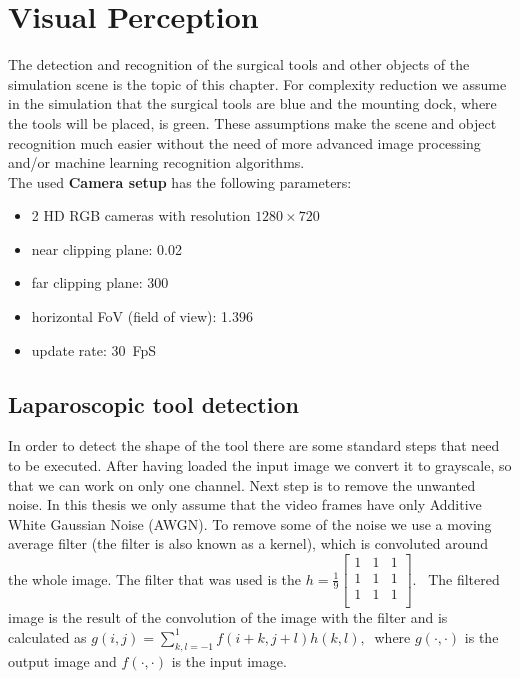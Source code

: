 \chapter{Visual Perception}
The detection and recognition of the surgical tools and other objects of the simulation scene is the topic of this chapter. For complexity reduction we assume in the simulation that the surgical tools are blue and the mounting dock, where the tools will be placed, is green. These assumptions make the scene and object recognition much easier without the need of more advanced image  processing and/or machine learning recognition algorithms.\\

The used \textbf{Camera setup} has the following parameters:
\begin{itemize}
\item 2 HD RGB cameras with resolution $1280 \times 720$
\item near clipping plane: 0.02
\item far clipping plane: 300 
\item horizontal FoV (field of view): 1.396
\item update rate: 30~FpS
\end{itemize}

\section{Laparoscopic tool detection}
\label{laparoscopic-tool-detection}

In order to detect the shape of the tool there are some standard steps that need to be executed. After having loaded the input image we convert it to grayscale, so that we can work on only one channel. Next step is 
to remove the unwanted noise. In this thesis we only assume that the video frames have only Additive White Gaussian Noise (AWGN). To remove some of the noise we use a moving average filter (the filter is also known as a kernel), which is convoluted around the whole image. The filter that was used is the $
h = \frac{1}{9} \begin{bmatrix}
1 & 1 & 1 \\
1 & 1 & 1 \\
1 & 1 & 1 \\
\end{bmatrix}
$.~
The filtered image is the result of the convolution of the image with the filter and is calculated as 
$
g(i,j) = \sum_{k,l=-1}^1 f(i+k,j+l)h(k,l),~
$
where $g(\cdot, \cdot)$ is the output image and $f(\cdot, \cdot)$ is the input image.

